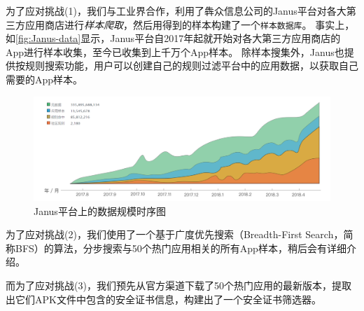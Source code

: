 为了应对挑战(1)，我们与工业界合作，利用了犇众信息公司的Janus平台对各大第三方应用商店进行\emph{样本爬取}，然后用得到的样本构建了一个\texttt{\small 样本数据库}。
事实上，如\autoref{fig:Janus-data}显示，Janus平台自2017年起就开始对各大第三方应用商店的App进行样本收集，至今已收集到上千万个App样本。
除样本搜集外，Janus也提供按规则搜索功能，用户可以创建自己的规则过滤平台中的应用数据，以获取自己需要的App样本。

\begin{figure}[htbp]
	\centering
	\includegraphics[width=\textwidth]{./Figures/edwin-Janus-data.png}
	\caption{Janus平台上的数据规模时序图}
	\label{fig:Janus-data}
	\vspace{-5mm}
\end{figure}

为了应对挑战(2)，我们使用了一个基于广度优先搜索（Breadth-First Search，简称BFS）的算法，分步搜索与50个热门应用相关的所有App样本，稍后会有详细介绍。

而为了应对挑战(3)，我们预先从官方渠道下载了50个热门应用的最新版本，提取出它们APK文件中包含的安全证书信息，构建出了一个安全证书筛选器。

